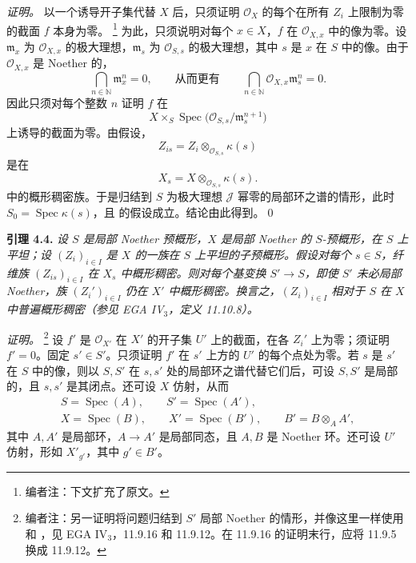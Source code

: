 \emph{证明。}
以一个诱导开子集代替 \(X\) 后，只须证明 \(\mathscr O_X\) 的每个在所有 \(Z_i\) 上限制为零的截面 \(f\) 本身为零。%
\footnote{编者注：下文扩充了原文。}
为此，只须说明对每个 \(x\in X\)，\(f\) 在 \(\mathscr O_{X,x}\) 中的像为零。设 \(\mathfrak m_x\) 为 \(\mathscr O_{X,x}\) 的极大理想，\(\mathfrak m_s\) 为 \(\mathscr O_{S,s}\) 的极大理想，其中 \(s\) 是 \(x\) 在 \(S\) 中的像。由于 \(\mathscr O_{X,x}\) 是 Noether 的，
\[
  \bigcap_{n\in\mathbb N}\mathfrak m_x^n=0,
  \qquad\text{从而更有}\qquad
  \bigcap_{n\in\mathbb N}\mathscr O_{X,x}\mathfrak m_s^n=0.
\]
因此只须对每个整数 \(n\) 证明 \(f\) 在
\[
  X\times_S
  \operatorname{Spec}\bigl(\mathscr O_{S,s}/\mathfrak m_s^{n+1}\bigr)
\]
上诱导的截面为零。由假设，
\[
  Z_{is}=Z_i\otimes_{\mathscr O_{S,s}}\kappa(s)
\]
是在
\[
  X_s=X\otimes_{\mathscr O_{S,s}}\kappa(s).
\]
中的概形稠密族。于是归结到 \(S\) 为极大理想 \(\mathscr J\) 幂零的局部环之谱的情形，此时 \(S_0=\operatorname{Spec}\kappa(s)\)，且  的假设成立。结论由此得到。\qed

\medskip
\noindent{}\textbf{引理 4.4.}
\textit{设 \(S\) 是局部 Noether 预概形，\(X\) 是局部 Noether 的 \(S\)-预概形，在 \(S\) 上平坦；设 \((Z_i)_{i\in I}\) 是 \(X\) 的一族在 \(S\) 上平坦的子预概形。假设对每个 \(s\in S\)，纤维族 \((Z_{is})_{i\in I}\) 在 \(X_s\) 中概形稠密。则对每个基变换 \(S'\to S\)，即使 \(S'\) 未必局部 Noether，族 \((Z_i')_{i\in I}\) 仍在 \(X'\) 中概形稠密。换言之，\((Z_i)_{i\in I}\) 相对于 \(S\) 在 \(X\) 中普遍概形稠密（参见 EGA IV\(_3\)，定义 11.10.8）。}

\emph{证明。}%
\footnote{编者注：另一证明将问题归结到 \(S'\) 局部 Noether 的情形，并像这里一样使用  和 ，见 EGA IV\(_3\)，11.9.16 和 11.9.12。在 11.9.16 的证明末行，应将 11.9.5 换成 11.9.12。}
设 \(f'\) 是 \(\mathscr O_{X'}\) 在 \(X'\) 的开子集 \(U'\) 上的截面，在各 \(Z_i'\) 上为零；须证明 \(f'=0\)。固定 \(s'\in S'\)。只须证明 \(f'\) 在 \(s'\) 上方的 \(U'\) 的每个点处为零。若 \(s\) 是 \(s'\) 在 \(S\) 中的像，则以 \(S,S'\) 在 \(s,s'\) 处的局部环之谱代替它们后，可设 \(S,S'\) 是局部的，且 \(s,s'\) 是其闭点。还可设 \(X\) 仿射，从而
\[
  \begin{gathered}
    S=\operatorname{Spec}(A),\qquad
    S'=\operatorname{Spec}(A'),\\
    X=\operatorname{Spec}(B),\qquad
    X'=\operatorname{Spec}(B'),\qquad
    B'=B\otimes_A A',
  \end{gathered}
\]
其中 \(A,A'\) 是局部环，\(A\to A'\) 是局部同态，且 \(A,B\) 是 Noether 环。还可设 \(U'\) 仿射，形如 \(X'_{g'}\)，其中 \(g'\in B'\)。

